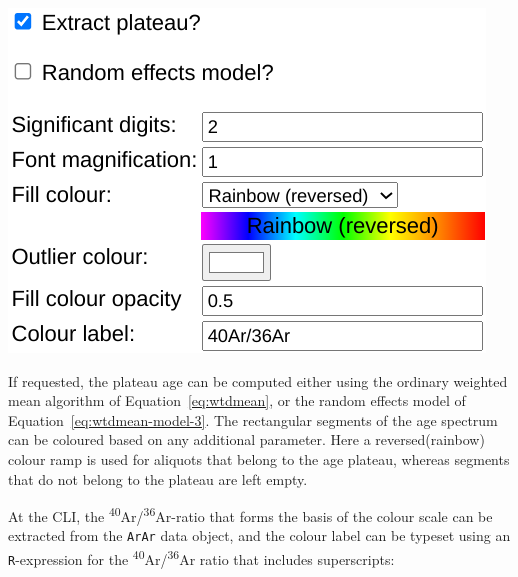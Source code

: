 \begin{refsection}
\noindent\begin{minipage}[t]{.4\linewidth}
\strut\vspace*{-\baselineskip}\newline
\includegraphics[width=\linewidth]{../figures/ArArAgeSpectrumOtherOptions.png}\\
\end{minipage}
\begin{minipage}[t]{.6\linewidth}
  If requested, the plateau age can be computed either using the
  ordinary weighted mean algorithm of Equation~\ref{eq:wtdmean}, or
  the random effects model of Equation~\ref{eq:wtdmean-model-3}.  The
  rectangular segments of the age spectrum can be coloured based on
  any additional parameter. Here a reversed(rainbow) colour ramp is
  used for aliquots that belong to the age plateau, whereas segments
  that do not belong to the plateau are left empty.
\end{minipage}

At the CLI, the \textsuperscript{40}Ar/\textsuperscript{36}Ar-ratio
that forms the basis of the colour scale can be extracted from the
\texttt{ArAr} data object, and the colour label can be typeset using
an \texttt{R}-expression for the
\textsuperscript{40}Ar/\textsuperscript{36}Ar ratio that includes
superscripts:

  

\end{refsection}
